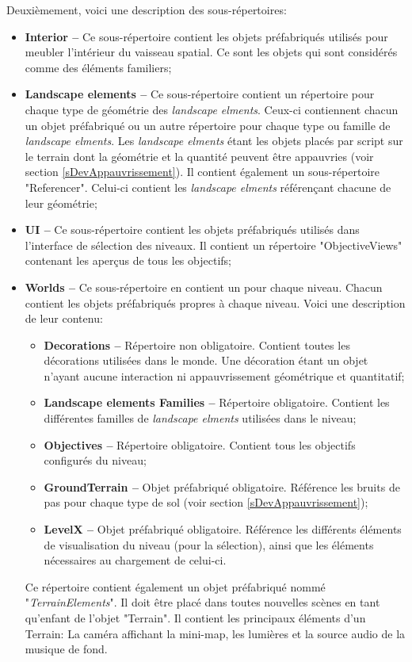 		Deuxièmement, voici une description des sous-répertoires:
		\begin{itemize}
			\item \textbf{Interior --} Ce sous-répertoire contient les objets préfabriqués utilisés pour meubler l'intérieur du vaisseau spatial. Ce sont les objets qui sont considérés comme des éléments familiers;
			\item \textbf{Landscape elements --} Ce sous-répertoire contient un répertoire pour chaque type de géométrie des \textit{landscape elments}. Ceux-ci contiennent chacun un objet préfabriqué ou un autre répertoire pour chaque type ou famille de \textit{landscape elments}. Les \textit{landscape elments} étant les objets placés par script sur le terrain dont la géométrie et la quantité peuvent être appauvries (voir section \ref{sDevAppauvrissement}). Il contient également un sous-répertoire "Referencer". Celui-ci contient les \textit{landscape elments} référençant chacune de leur géométrie;
			\item \textbf{UI --} Ce sous-répertoire contient les objets préfabriqués utilisés dans l'interface de sélection des niveaux. Il contient un répertoire "ObjectiveViews" contenant les aperçus de tous les objectifs;
			\item \textbf{Worlds --} Ce sous-répertoire en contient un pour chaque niveau. Chacun contient les objets préfabriqués propres à chaque niveau. Voici une description de leur contenu:
			\begin{itemize}
				\item \textbf{Decorations --} Répertoire non obligatoire. Contient toutes les décorations utilisées dans le monde. Une décoration étant un objet n'ayant aucune interaction ni appauvrissement géométrique et quantitatif;
				\item \textbf{Landscape elements Families --} Répertoire obligatoire. Contient les différentes familles de \textit{landscape elments} utilisées dans le niveau;
				\item \textbf{Objectives --} Répertoire obligatoire. Contient tous les objectifs configurés du niveau;
				\item \textbf{GroundTerrain --} Objet préfabriqué obligatoire. Référence les bruits de pas pour chaque type de sol (voir section \ref{sDevAppauvrissement});
				\item \textbf{LevelX --} Objet préfabriqué obligatoire. Référence les différents éléments de visualisation du niveau (pour la sélection), ainsi que les éléments nécessaires au chargement de celui-ci.
			\end{itemize}
			
			Ce répertoire contient également un objet préfabriqué nommé "\textit{TerrainElements}". Il doit être placé dans toutes nouvelles scènes en tant qu'enfant de l'objet "Terrain". Il contient les principaux éléments d'un Terrain: La caméra affichant la mini-map, les lumières et la source audio de la musique de fond.
		\end{itemize}
	
